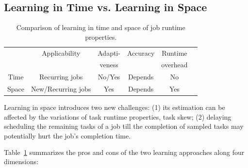 \subsection{Learning in Time vs. Learning in Space}
\label{sec:comparison}

\begin{table}[tp]
\caption{Comparison of learning in time and space of job runtime properties.}
\label{table:proscons}
\centering
{\small
\vspace{-0.1in}
\begin{tabular}{|c|c|c|c|c|c|}
\hline
                        & Applicability & Adapti- & Accuracy & Runtime \\
	                &               &         veness     &          & overhead\\
\hline
	Time & Recurring jobs & No/Yes & Depends  & No\\
\hline
	Space &New/Recurring jobs & Yes & Depends & Yes\\
\hline
\end{tabular}
}
\vspace{-0.1in}
\end{table}

Learning in space introduces two new challenges:
%
(1) its estimation can be affected by the variations of task runtime
properties, \ie task skew;
%
(2) delaying scheduling the remaining tasks of a job till the completion of
sampled tasks may potentially hurt the job's completion time.

Table~\ref{table:proscons} summarizes the pros and cons of the two
learning approaches along four dimensions:

